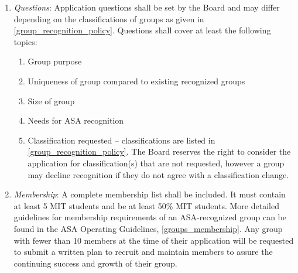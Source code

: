 \documentclass[12pt]{constitution}
\begin{document}
\begin{enumerate}
    \item \textit{Questions}: Application questions shall be set by the Board and may differ depending on the
        classifications of groups as given in \ref{group_recognition_policy}.
    Questions shall cover at least the following topics:
    \begin{enumerate}
        \item Group purpose
        \item Uniqueness of group compared to existing recognized groups
        \item Size of group
        \item Needs for ASA recognition
        \item Classification requested -- classifications are listed in \ref{group_recognition_policy}.
        The Board reserves the right to consider the application for classification(s) that are not requested,
            however a group may decline recognition if they do not agree with a classification change.
    \end{enumerate}

    \item \textit{Membership}: A complete membership list shall be included.
    It must contain at least 5 MIT students and be at least 50\% MIT students.
    More detailed guidelines for membership requirements of an ASA-recognized group can be found in the
        ASA Operating Guidelines, \ref{groups_membership}.
    Any group with fewer than 10 members at the time of their application will be
        requested to submit a written plan to recruit and maintain members to assure the continuing
        success and growth of their group.


\end{enumerate}
\end{document}
